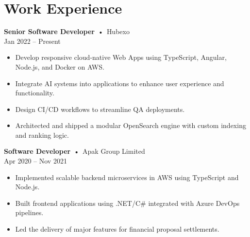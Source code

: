 \documentclass[11pt,a4paper]{moderncv}
\begin{document}
\section{Work Experience}
\vspace{-1em}

\begin{minipage}[c]{0.08\textwidth}
  \raggedleft
\end{minipage}%
\hspace{0.5em}%
\begin{minipage}[t]{0.95\textwidth}
  \textbf{Senior Software Developer} \,•\, {\color{mydarkblue}Hubexo}\\
  {\footnotesize Jan 2022 -- Present}
  \begin{itemize}
    \item Develop responsive cloud-native Web Apps using TypeScript, Angular, Node.js, and Docker on AWS.
    \item Integrate AI systems into applications to enhance user experience and functionality.
    \item Design CI/CD workflows to streamline QA deployments.
    \item Architected and shipped a modular OpenSearch engine with custom indexing and ranking logic.
  \end{itemize}
\end{minipage}
\vspace{0.5em}

\begin{minipage}[c]{0.08\textwidth}
  \raggedleft
\end{minipage}%
\hspace{0.5em}%
\begin{minipage}[t]{0.9\textwidth}
  \textbf{Software Developer} \,•\, {\color{mydarkblue}Apak Group Limited}\\
  {\footnotesize Apr 2020 -- Nov 2021}
  \begin{itemize}
    \item Implemented scalable backend microservices in AWS using TypeScript and Node.js.
    \item Built frontend applications using .NET/C\# integrated with Azure DevOps pipelines.
    \item Led the delivery of major features for financial proposal settlements.
  \end{itemize}
\end{minipage}
\vspace{0.5em}
\end{document}
